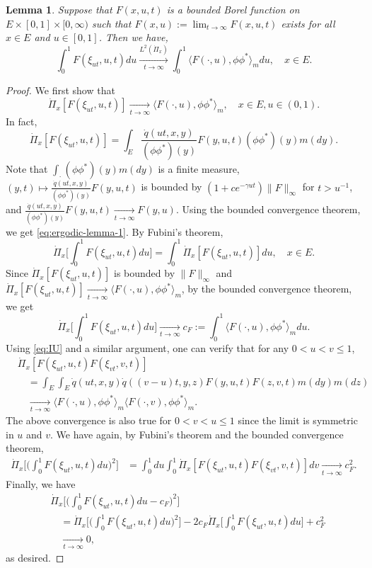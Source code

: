 \documentclass[UTF8]{pkuthss}
\theoremstyle{plain}
\newtheorem{lem}[thm]{Lemma}
\theoremstyle{definition}
\numberwithin{equation}{section}
\begin{document}
\begin{lem}
\label{lem:ergodic}
	Suppose that $F(x,u,t)$ is a bounded Borel function on $E\times [0,1]\times [0,\infty)$ such that $F(x,u):= \lim_{t\to\infty} F(x,u,t)$ exists for all $x\in E$ and $u\in [0,1]$.
	Then we have,
\[
	\int_0^1 F(\xi_{ut},u,t)du
	\xrightarrow[t\to\infty]{L^2(\dot{\Pi}_x)} \int_0^1 \langle F(\cdot ,u),\phi\phi^* \rangle_m du,
	\quad x\in E.
\]
\end{lem}
\begin{proof}
\par
	We first show that
\begin{equation}\label{eq:ergodic-lemma-1}
	\dot{\Pi}_x[F(\xi_{ut},u,t)]
	\xrightarrow[t\to\infty]{} \langle F(\cdot,u),\phi\phi^*\rangle_m,
      \quad x\in E, u\in(0,1).
\end{equation}
	In fact,
\[
	\dot{\Pi}_x[F(\xi_{ut},u,t)]
	=\int_E \frac{\dot{q}(ut,x,y)}{(\phi\phi^*)(y)}F(y,u,t)(\phi\phi^*)(y)m(dy).
\]
	Note that $\int_\cdot (\phi\phi^*)(y)m(dy)$ is a finite measure, $(y,t)\mapsto \frac{\dot{q}(ut,x,y)}{(\phi\phi^*)(y)}F(y,u,t)$ is bounded by $(1+ce^{-\gamma ut})\|F\|_\infty$ for $t>u^{-1}$, and $\frac{\dot{q}(ut,x,y)}{(\phi\phi^*)(y)}F(y,u,t)\xrightarrow[t\to\infty]{}F(y,u)$.
	Using the bounded convergence theorem, we get \eqref{eq:ergodic-lemma-1}.
	By Fubini's theorem,
\[
	\dot{\Pi}_x\big[\int_0^1F(\xi_{ut},u,t)du\big]
	=\int_0^1\dot{\Pi}_x[F(\xi_{ut},u,t)]du,
	\quad x\in E.
\]
	Since $\dot{\Pi}_x[F(\xi_{ut},u,t)]$ is bounded by $\|F\|_\infty$ and $\dot{\Pi}_x[F(\xi_{ut},u,t)]\xrightarrow[t\to\infty]{}\langle F(\cdot, u),\phi\phi^*\rangle_m$, by the bounded convergence theorem, we get
\[
	\dot{\Pi}_x\big[\int_0^1F(\xi_{ut},u,t)du\big]
	\xrightarrow[t\to\infty]{} c_F
	:=\int_0^1\langle F(\cdot,u),\phi\phi^*\rangle_mdu.
\]
Using \eqref{eq:IU} and a similar argument,
	one can verify that for any $0< u< v\leq 1$,
\begin{align}
	&\dot{\Pi}_x[F(\xi_{ut},u,t)F(\xi_{vt},v,t)]\\
	&\quad=\int_E\int_E  \dot{q}(ut,x,y) \dot{q}((v-u)t,y,z)F(y,u,t)F(z,v,t)m(dy)m(dz)\\
	&\quad\xrightarrow[t\to\infty]{} \langle F(\cdot,u),\phi\phi^*\rangle_m \langle F(\cdot,v),\phi\phi^*\rangle_m.
\end{align}
	The above convergence is also true for $0< v < u\leq 1$ since the limit is symmetric in $u$ and $v$.
	We have again, by Fubini's theorem and the bounded convergence theorem,
\begin{align}
	\dot{\Pi}_x\Big[\big(\int_0^1 F(\xi_{ut},u,t)du\big)^2\Big]
	&=\int_0^1du\int_0^1\dot{\Pi}_x[F(\xi_{ut},u,t)F(\xi_{vt},v,t)]dv\xrightarrow[t\to\infty]{} c_F^2.
\end{align}
	Finally, we have
\begin{align}
	&\dot{\Pi}_x\Big[\big(\int_0^1 F(\xi_{ut},u,t)du - c_F\big)^2\Big]\\
	&\quad =\dot{\Pi}_x\Big[\big(\int_0^1 F(\xi_{ut},u,t)du\big)^2\Big] -2c_F \dot{\Pi}_x\Big[\int_0^1 F(\xi_{ut},u,t)du\Big]+ c_F^2\\
	&\quad \xrightarrow[t\to\infty]{} 0,
\end{align}
	as desired.
\end{proof}
\end{document}
